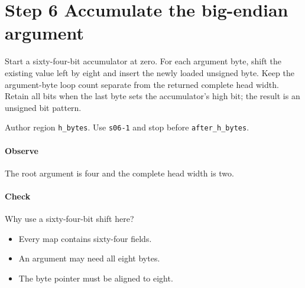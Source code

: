 \section{Step 6 Accumulate the big-endian argument}\label{cbor-s06}
Start a sixty-four-bit accumulator at zero. For each argument byte, shift the existing value left by eight and insert the newly loaded unsigned byte. Keep the argument-byte loop count separate from the returned complete head width. Retain all bits when the last byte sets the accumulator's high bit; the result is an unsigned bit pattern.

Author region \texttt{h\_bytes}. Use \texttt{s06-1} and stop before \texttt{after\_h\_bytes}.

\paragraph{Observe} The root argument is four and the complete head width is two.

\paragraph{Check} Why use a sixty-four-bit shift here?
\begin{itemize}
  \item[A.] Every map contains sixty-four fields.
  \item[B.] An argument may need all eight bytes.
  \item[C.] The byte pointer must be aligned to eight.
\end{itemize}
